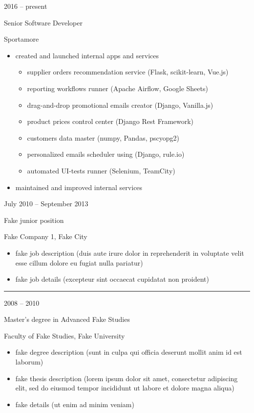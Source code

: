 \documentclass[a4paper,10pt]{article}
\newlength{\cvcolumngapwidth}
\newlength{\cvleftcolumnwidth}
\newlength{\cvrightcolumnwidth}
\newcommand{\cvsectionstyle}[1]{{\normalsize\cvsectionfont\textcolor{cvsectioncolor}{#1}}}
\newcommand{\cvtitlestyle}[1]{{\large\cvtitlefont\textcolor{cvtitlecolor}{#1}}}
\newcommand{\cvdurationstyle}[1]{{\small\cvdurationfont\textcolor{cvdurationcolor}{#1}}}
\newlength{\cvafteritemskipamount}
\newlength{\cvaftersectionskipamount}
\newlength{\cvaftertitleskipamount}
\newlength{\cvparskip}
\newcommand{\cvsection}[1]{
    \begin{minipage}[t]{\cvleftcolumnwidth}
        \raggedleft\cvsectionstyle{#1}
    \end{minipage}%
    \hspace{\cvcolumngapwidth}%
    \begin{minipage}[t]{\cvrightcolumnwidth}
        \textcolor{cvrulecolor}{\rule{\cvrightcolumnwidth}{0.3mm}}
    \end{minipage}

    \vspace{\cvaftersectionskipamount}
}
\newcommand{\cvitem}[2]{
    \begin{minipage}[t]{\cvleftcolumnwidth}
        \raggedleft #1
    \end{minipage}%
    \hspace{\cvcolumngapwidth}%
    \begin{minipage}[t]{\cvrightcolumnwidth}
        \setlength{\parskip}{\cvparskip} #2
    \end{minipage}

    \vspace{\cvafteritemskipamount}
}
\newcommand{\cvtitle}[1]{
    \cvtitlestyle{#1}

    \vspace{\cvaftertitleskipamount}
    \vspace{-\cvparskip}
}
\begin{document}
\cvitem{
    \cvdurationstyle{2016 -- present}
}{
    \cvtitle{Senior Software Developer}

    Sportamore

    \begin{itemize}[leftmargin=*]
        \item created and launched internal apps and services 
	    \begin{itemize}[leftmargin=*]
		\item supplier orders recommendation service (Flask, scikit-learn, Vue.js)
		\item reporting workflows runner (Apache Airflow, Google Sheets)
		\item drag-and-drop promotional emails creator (Django, Vanilla.js)
		\item product prices control center (Django Rest Framework)
		\item customers data master (numpy, Pandas, pscyopg2)
		\item personalized emails scheduler using (Django, rule.io)               	 		
		\item automated UI-tests runner (Selenium, TeamCity)
	    \end{itemize}
        \item maintained and improved internal services 
    \end{itemize}
}

\cvitem{
    \cvdurationstyle{July 2010 -- September 2013}
}{
    \cvtitle{Fake junior position}

    Fake Company 1, Fake City

    \begin{itemize}[leftmargin=*]
        \item fake job description (duis aute irure dolor in reprehenderit in voluptate velit esse cillum dolore eu
              fugiat nulla pariatur)
        \item fake job details (excepteur sint occaecat cupidatat non proident)
    \end{itemize}
}



\cvsection{EDUCATION}

\cvitem{
    \cvdurationstyle{2008 -- 2010}
}{
    \cvtitle{Master's degree in Advanced Fake Studies}

    Faculty of Fake Studies, Fake University

    \begin{itemize}[leftmargin=*]
        \item fake degree description (sunt in culpa qui officia deserunt mollit anim id est laborum)
        \item fake thesis description (lorem ipsum dolor sit amet, consectetur adipiscing elit, sed do eiusmod tempor
              incididunt ut labore et dolore magna aliqua)
        \item fake details (ut enim ad minim veniam)
    \end{itemize}
}
\end{document}
